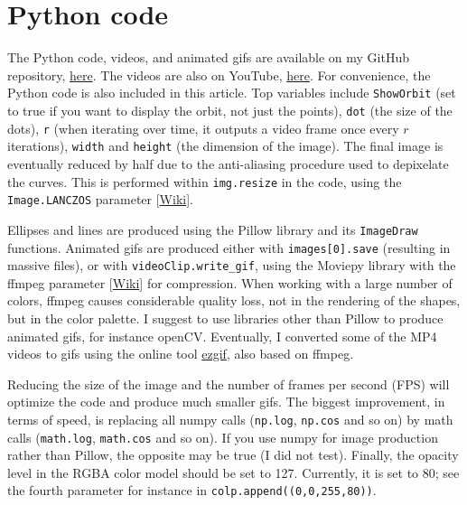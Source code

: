 \documentclass[oneside,10pt]{book}
\renewcommand{\arraystretch}{1.4} %
\begin{document}
\renewcommand{\arraystretch}{1.0} %
\renewcommand{\arraystretch}{1.4} %

\section{Python code}\label{pythonviz}

The Python code, videos, and animated gifs are available on my GitHub repository, \href{https://github.com/VincentGranville/Visualizations}{here}.
The videos are also on YouTube, \href{https://www.youtube.com/c/VincentGranvilleVideos}{here}. For convenience, the Python code is also included
in this article. Top variables include \texttt{ShowOrbit} (set to true if you want to display the orbit, not just the points), \texttt{dot} (the size of the dots), \texttt{r} (when iterating over time, it outputs a video frame once every $r$ iterations), \texttt{width} and \texttt{height} (the dimension of the image). The final image is eventually reduced by half due to the \textcolor{index}{anti-aliasing} procedure used to depixelate the curves. This is performed
within \texttt{img.resize} in the code, using the \texttt{Image.LANCZOS} parameter [\href{https://en.wikipedia.org/wiki/Lanczos_resampling}{Wiki}].

Ellipses and lines are produced using the Pillow library and its \texttt{ImageDraw} functions. Animated gifs are produced either
with
\texttt{images[0].save}
(resulting in massive files), or with \texttt{videoClip.write\_gif}, using the Moviepy library with the \textcolor{index}{ffmpeg} parameter [\href{https://en.wikipedia.org/wiki/FFmpeg}{Wiki}] for compression. When working with a large number of colors, ffmpeg causes considerable quality loss, not in the rendering of the shapes, but in the color palette.  I suggest to use libraries other than Pillow to produce animated gifs, for instance openCV. Eventually, I converted some of the MP4 videos to gifs using the online tool \href{https://ezgif.com/video-to-gif}{ezgif}, also based on ffmpeg.

Reducing the size of the image and the number of frames per second (FPS)  will optimize the code and produce much smaller gifs. The biggest improvement, in terms of speed, is replacing all numpy calls (\texttt{np.log}, \texttt{np.cos} and so on) by math calls
(\texttt{math.log}, \texttt{math.cos} and so on). If you use numpy for image production rather than Pillow, the opposite may be true (I did not test). Finally, the opacity level in the RGBA color model should be set to 127. Currently, it is set to 80; see the fourth parameter for instance in
\texttt{colp.append((0,0,255,80))}.
\end{document}

